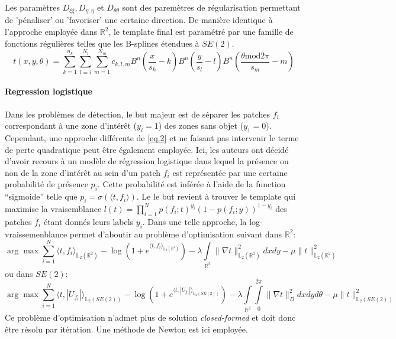 \documentclass{article}
\begin{document}
Les paramètres $D_{\xi \xi}, D_{\eta, \eta}$ et $D_{\theta \theta}$ sont des paremètres de régularisation permettant de 'pénaliser' ou 'favoriser' une certaine direction.
De manière identique à l'approche employée dans $\mathbb{R}^2$, le template final est paramétré par une famille de fonctions
régulières telles que les B-splines étendues à $SE(2)$.
\[
    t(x, y, \theta) = \sum \limits_{k=1}^{n_k} \sum \limits_{l=i}^{N_l} \sum \limits_{m=1}^{N_m} c_{k,l,m} B^n \left (\frac{x}{s_k} - k \right )
    B^n \left (\frac{y}{s_l} - l \right) B^n \left (\frac{\theta \text{mod} 2\pi}{s_m} - m \right )
\]

\paragraph{Regression logistique}
Dans les problèmes de détection, le but majeur est de séparer les patches $f_i$ correspondant à une 
zone d'intérêt ($y_i =1$) des zones sans objet ($y_1=0$). Cependant, une approche différente de \ref{eq.2} et ne faisant pas intervenir le terme de perte quadratique 
peut être également employée. Ici, les auteurs ont décidé d'avoir recours à un modèle de régression logistique dans lequel la présence ou non de 
la zone d'intérêt au sein d'un patch $f_i$ est représentée par une certaine probabilité de présence $p_i$. Cette probabilité est inférée à l'aide de
la function ``sigmoide'' telle que $p_i = \sigma(\langle t, f_i \rangle)$. Le le but revient à trouver le template qui maximise la vraisemblance $l(t) = 
\prod \limits_{i=1}^N p(f_i; t)^{y_i}(1 - p(f_i; y))^{1- y_i}$
des patches $f_i$ étant donnés leurs labels $y_i$. Dans une telle approche, la log-vraissemenblance permet d'aboutir au problème d'optimisation suivant
dans $\mathbb{R}^2$:
\[
    \arg \max \sum \limits_{i=1}^N \langle t, f_i \rangle_{\mathbb{L}_2(\mathbb{R}^2)} - \log \left ( 1 + e^{\langle t, f_i \rangle_{\mathbb{L}_2(\mathbb{R}^2)}}\right) - \lambda \int \limits_{\mathbb{R}^2} \lVert \nabla 
    t \rVert_{\mathbb{L}_2(\mathbb{R}^2)}^2 dx dy - \mu \lVert t \rVert_{\mathbb{L}_2(\mathbb{R}^2)}^2
\]
ou dans $SE(2)$:
\[
    \arg \max \sum \limits_{i=1}^N \langle t, |U_{f_i}| \rangle_{\mathbb{L}_2(SE(2))} - \log \left ( 1 + e^{\langle t, |U_{f_i}| \rangle_{\mathbb{L}_2(SE(2))}}\right) - \lambda \int \limits_{\mathbb{R}^2} \int \limits_{0}^{2\pi}\lVert \nabla 
    t \rVert_{D}^2 dx dy d\theta- \mu \lVert t \rVert_{\mathbb{L}_2(SE(2))}^2
\]
Ce problème d'optimisation n'admet plus de solution \textit{closed-formed} et doit donc être résolu par itération. Une méthode de Newton est ici employée. 
\end{document}
